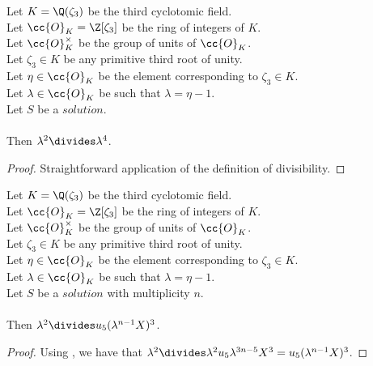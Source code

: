 \begin{lemma}
  \label{lmm:lambda_sq_div_lambda_fourth}
  \leanok
  Let $K = \Q(\zeta_3)$ be the third cyclotomic field. \\
  Let $\cc{O}_K = \Z[\zeta_3]$ be the ring of integers of $K$. \\
  Let $\cc{O}^\times_K$ be the group of units of $\cc{O}_K$. \\
  Let $\zeta_3 \in K$ be any primitive third root of unity. \\
  Let $\eta \in \cc{O}_K$ be the element corresponding to $\zeta_3 \in K$. \\
  Let $\lambda \in \cc{O}_K$ be such that $\lambda = \eta -1$. \\
  Let $S$ be a $solution$.\\\\
  Then $\lambda^2 \divides \lambda^4$.
\end{lemma}
\begin{proof}
  \leanok
  Straightforward application of the definition of divisibility.
\end{proof}

\begin{lemma}
  \label{lmm:lambda_sq_div_new_X_cubed}
  \leanok
  Let $K = \Q(\zeta_3)$ be the third cyclotomic field. \\
  Let $\cc{O}_K = \Z[\zeta_3]$ be the ring of integers of $K$. \\
  Let $\cc{O}^\times_K$ be the group of units of $\cc{O}_K$. \\
  Let $\zeta_3 \in K$ be any primitive third root of unity. \\
  Let $\eta \in \cc{O}_K$ be the element corresponding to $\zeta_3 \in K$. \\
  Let $\lambda \in \cc{O}_K$ be such that $\lambda = \eta -1$. \\
  Let $S$ be a $solution$ with multiplicity $n$.\\\\
  Then $\lambda^2 \divides u_5 (\lambda^{n - 1} X)^3$.
\end{lemma}
\begin{proof}
  \leanok
  Using , we have that $\lambda^2 \divides
  \lambda^2 u_5 \lambda^{3n-5} X^3 = u_5 (\lambda^{n - 1} X)^3$.
\end{proof}

